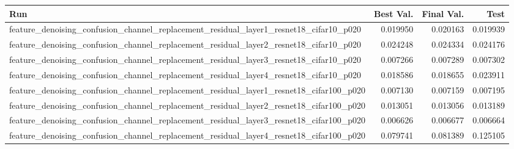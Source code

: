 \begin{tabular}{lrrr}
\toprule
Run & Best Val. & Final Val. & Test \\
\midrule
feature\_denoising\_confusion\_channel\_replacement\_residual\_layer1\_resnet18\_cifar10\_p020 & 0.019950 & 0.020163 & 0.019939 \\
feature\_denoising\_confusion\_channel\_replacement\_residual\_layer2\_resnet18\_cifar10\_p020 & 0.024248 & 0.024334 & 0.024176 \\
feature\_denoising\_confusion\_channel\_replacement\_residual\_layer3\_resnet18\_cifar10\_p020 & 0.007266 & 0.007289 & 0.007302 \\
feature\_denoising\_confusion\_channel\_replacement\_residual\_layer4\_resnet18\_cifar10\_p020 & 0.018586 & 0.018655 & 0.023911 \\
feature\_denoising\_confusion\_channel\_replacement\_residual\_layer1\_resnet18\_cifar100\_p020 & 0.007130 & 0.007159 & 0.007195 \\
feature\_denoising\_confusion\_channel\_replacement\_residual\_layer2\_resnet18\_cifar100\_p020 & 0.013051 & 0.013056 & 0.013189 \\
feature\_denoising\_confusion\_channel\_replacement\_residual\_layer3\_resnet18\_cifar100\_p020 & 0.006626 & 0.006677 & 0.006664 \\
feature\_denoising\_confusion\_channel\_replacement\_residual\_layer4\_resnet18\_cifar100\_p020 & 0.079741 & 0.081389 & 0.125105 \\
\bottomrule
\end{tabular}
